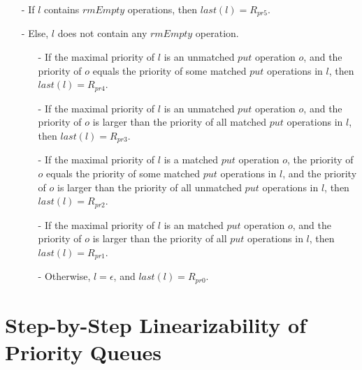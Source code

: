 \documentclass{llncs}
\begin{document}
\begin{itemize}
\setlength{\itemsep}{0.5pt}
\item[-] If $l$ contains $\textit{rmEmpty}$ operations, then $\textit{last}(l) = R_{\textit{pr5}}$.
\item[-] Else, $l$ does not contain any $\textit{rmEmpty}$ operation.
    \begin{itemize}
    \setlength{\itemsep}{0.5pt}
    \item[-] If the maximal priority of $l$ is an unmatched $\textit{put}$ operation $o$, and the priority of $o$ equals the priority of some matched $\textit{put}$ operations in $l$, then $\textit{last}(l) = R_{\textit{pr4}}$.

    \item[-] If the maximal priority of $l$ is an unmatched $\textit{put}$ operation $o$, and the priority of $o$ is larger than the priority of all matched $\textit{put}$ operations in $l$, then $\textit{last}(l) = R_{\textit{pr3}}$.

    \item[-] If the maximal priority of $l$ is a matched $\textit{put}$ operation $o$, the priority of $o$ equals the priority of some matched $\textit{put}$ operations in $l$, and the priority of $o$ is larger than the priority of all unmatched $\textit{put}$ operations in $l$, then $\textit{last}(l) = R_{\textit{pr2}}$.

    \item[-] If the maximal priority of $l$ is an matched $\textit{put}$ operation $o$, and the priority of $o$ is larger than the priority of all $\textit{put}$ operations in $l$, then $\textit{last}(l) = R_{\textit{pr1}}$.

    \item[-] Otherwise, $l = \epsilon$, and $\textit{last}(l) = R_{\textit{pr0}}$.
    \end{itemize}
\end{itemize}








\section{Step-by-Step Linearizability of Priority Queues}
\label{sec:step-by-step linearizability of priority queues}
\end{document}
